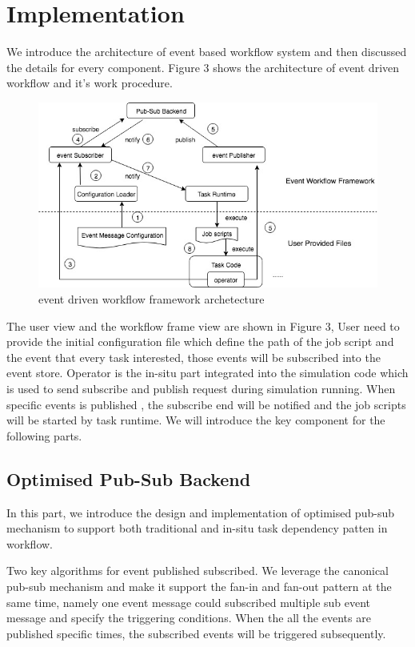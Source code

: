 

\section{Implementation}
We introduce the architecture of event based workflow system and then discussed the details for every component. Figure 3 shows the architecture of  event driven workflow and it's work procedure.

\begin{figure} 
\centering
\includegraphics[width=.8\linewidth]{./figure/edflowarchitecture.jpg}
\caption{event driven workflow framework archetecture}
 \label{fg:state}
\end{figure} 


The user view and the workflow frame view are shown in Figure 3,  User need to provide the initial configuration file which define the path of the job script and the event  that every task interested, those events will be subscribed into the event store. Operator is the in-situ part integrated into the simulation code which is used to send subscribe and publish request during simulation running.   When specific events is published , the subscribe end will be notified and the job scripts will be started by task runtime. We will introduce the key component for the following parts. 


\subsection{Optimised Pub-Sub Backend}

In this part, we introduce the design and implementation of optimised pub-sub mechanism to support both traditional and in-situ task dependency patten in workflow.

Two key algorithms for event published subscribed. We leverage the canonical pub-sub mechanism and make it support the fan-in and fan-out pattern at the same time, namely one event message could subscribed multiple sub event message and specify the triggering conditions. When the all the events are published specific times, the subscribed events will be triggered subsequently.


